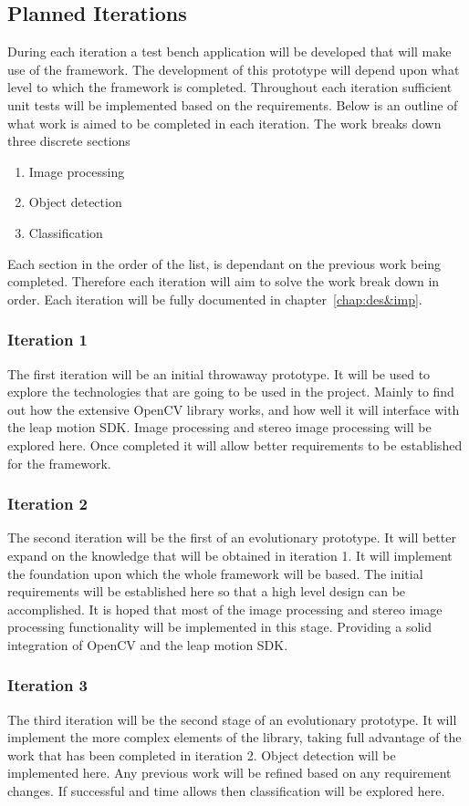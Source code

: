 \documentclass[11pt,oneside]{report}
\begin{document}
			\subsection{Planned Iterations}
					During each iteration a test bench application will be developed that will make use of the framework.
					The development of this prototype will depend upon what level to which the framework is completed.
					Throughout each iteration sufficient unit tests will be implemented based on the requirements.
					Below is an outline of what work is aimed to be completed in each iteration.
					The work breaks down three discrete sections
					\begin{enumerate}
						\item Image processing
						\item Object detection
						\item Classification
					\end{enumerate}
					Each section in the order of the list, is dependant on the previous work being completed.	
					Therefore each iteration will aim to solve the work break down in order.
					Each iteration will be fully documented in chapter~\ref{chap:des&imp}.
					\subsubsection{Iteration 1}
					The first iteration will be an initial throwaway prototype.
					It will be used to explore the technologies that are going to be used in the project.
					Mainly to find out how the extensive OpenCV library works, and how well it will interface with the leap motion SDK.
					Image processing and stereo image processing will be explored here.
					Once completed it will allow better requirements to be established for the framework.
					\subsubsection{Iteration 2}
					The second iteration will be the first of an evolutionary prototype.
					It will better expand on the knowledge that will be obtained in iteration 1.
					It will implement the foundation upon which the whole framework will be based.
					The initial requirements will be established here so that a high level design can be accomplished.
					It is hoped that most of the image processing and stereo image processing functionality will be implemented in this stage.
					Providing a solid integration of OpenCV and the leap motion SDK.
					\subsubsection{Iteration 3}
					The third iteration will be the second stage of an evolutionary prototype.
					It will implement the more complex elements of the library, taking full advantage of the work that has been completed in iteration 2.
					Object detection will be implemented here.
					Any previous work will be refined based on any requirement changes.
					If successful and time allows then classification will be explored here.
\end{document}
